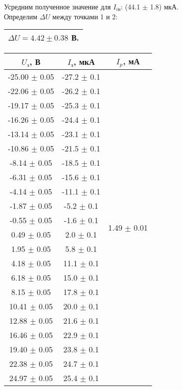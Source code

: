 \documentclass[a4paper,12pt]{article}
\begin{document}
Усредним полученное значение для $I_{i\text{н}}$: (44.1 $\pm$ 1.8) мкА. \\

Определим $\Delta U$ между точками 1 и 2: \begin{tabular}{|c|} \hline $\Delta U = 4.42 \pm 0.38$ В.\\ \hline \end{tabular}

\begin{tabular}{|c|c|c|}
	\hline
	$U_{\text{з}}$, В & $I_{\text{з}}$, мкА &  $I_p$, мА \\
	\hline
	-25.00 $\pm$ 0.05 & -27.2 $\pm$ 0.1 & \multirow{22}{*}{1.49 $\pm$ 0.01}\\
	\cline{1-2} 
	-22.06 $\pm$ 0.05 & -26.2 $\pm$ 0.1 & \\
	\cline{1-2}
	-19.17 $\pm$ 0.05 & -25.3 $\pm$ 0.1 & \\
	\cline{1-2}
	-16.26 $\pm$ 0.05 & -24.4 $\pm$ 0.1 & \\
	\cline{1-2}
	-13.14 $\pm$ 0.05 & -23.1 $\pm$ 0.1 & \\
	\cline{1-2}
	-10.86 $\pm$ 0.05 & -21.5 $\pm$ 0.1 & \\
	\cline{1-2}
	-8.14 $\pm$ 0.05 & -18.5 $\pm$ 0.1 & \\
	\cline{1-2}
	-6.31 $\pm$ 0.05 & -15.6 $\pm$ 0.1 & \\
	\cline{1-2}
	-4.14 $\pm$ 0.05 & -11.1 $\pm$ 0.1 & \\
	\cline{1-2}
	-1.87 $\pm$ 0.05 & -5.2 $\pm$ 0.1 & \\
	\cline{1-2}
	-0.55 $\pm$ 0.05 & -1.6 $\pm$ 0.1 & \\
	\cline{1-2}
	0.49 $\pm$ 0.05 & 2.0 $\pm$ 0.1 & \\
	\cline{1-2}
	1.95 $\pm$ 0.05 & 5.8 $\pm$ 0.1 & \\
	\cline{1-2}
	4.18 $\pm$ 0.05 & 11.1 $\pm$ 0.1 & \\
	\cline{1-2}
	6.18 $\pm$ 0.05 & 15.0 $\pm$ 0.1 & \\
	\cline{1-2}
	8.15 $\pm$ 0.05 & 17.8 $\pm$ 0.1 & \\
	\cline{1-2}
	10.41 $\pm$ 0.05 & 20.0 $\pm$ 0.1 & \\
	\cline{1-2}
	12.88 $\pm$ 0.05 & 21.6 $\pm$ 0.1 & \\
	\cline{1-2}
	16.46 $\pm$ 0.05 & 22.9 $\pm$ 0.1 & \\
	\cline{1-2}
	19.40 $\pm$ 0.05 & 23.8 $\pm$ 0.1 & \\
	\cline{1-2}
	22.38 $\pm$ 0.05 & 24.7 $\pm$ 0.1 & \\
	\cline{1-2}
	24.97 $\pm$ 0.05 & 25.4 $\pm$ 0.1 & \\
	\hline
\end{tabular}
\end{document}
